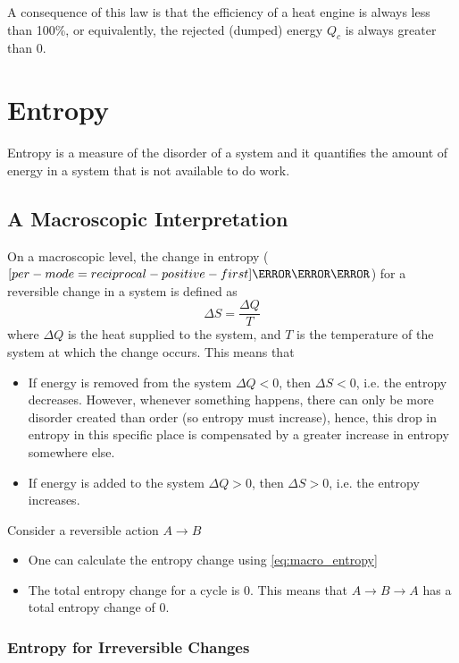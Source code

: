 \documentclass[a4paper,12pt]{article}
\let\oldsection\section
\renewcommand\section{\clearpage\oldsection}
\let\oldsi\si
\renewcommand{\si}[1]{\oldsi[per-mode=reciprocal-positive-first]{#1}}
\begin{document}
A consequence of this law is that the efficiency of a heat engine is always less than 100\%, or equivalently, the rejected (dumped) energy $Q_c$ is always greater than 0.

\section{Entropy}

Entropy is a measure of the disorder of a system and it quantifies the amount of energy in a system that is not available to do work.

\subsection{A Macroscopic Interpretation}

On a macroscopic level, the change in entropy ($\si{\joule\per\kelvin}$) for a reversible change in a system is defined as
\begin{equation}\label{eq:macro_entropy}
  \Delta S = \dfrac{\Delta Q}{T}
\end{equation}
where $\Delta Q$ is the heat supplied to the system, and $T$ is the temperature of the system at which the change occurs. This means that
\begin{itemize}
  \item If energy is removed from the system $\Delta Q < 0$, then $\Delta S < 0$, i.e. the entropy decreases. However, whenever something happens, there can only be more disorder created than order (so entropy must increase), hence, this drop in entropy in this specific place is compensated by a greater increase in entropy somewhere else.
  \item If energy is added to the system $\Delta Q > 0$, then $\Delta S > 0$, i.e. the entropy increases.
\end{itemize}
Consider a reversible action $A \rightarrow B$
\begin{itemize}
  \item One can calculate the entropy change using \cref{eq:macro_entropy}
  \item The total entropy change for a cycle is 0. This means that $A\rightarrow B \rightarrow A$ has a total entropy change of 0.
\end{itemize}

\pagebreak

\subsubsection{Entropy for Irreversible Changes}
\end{document}
